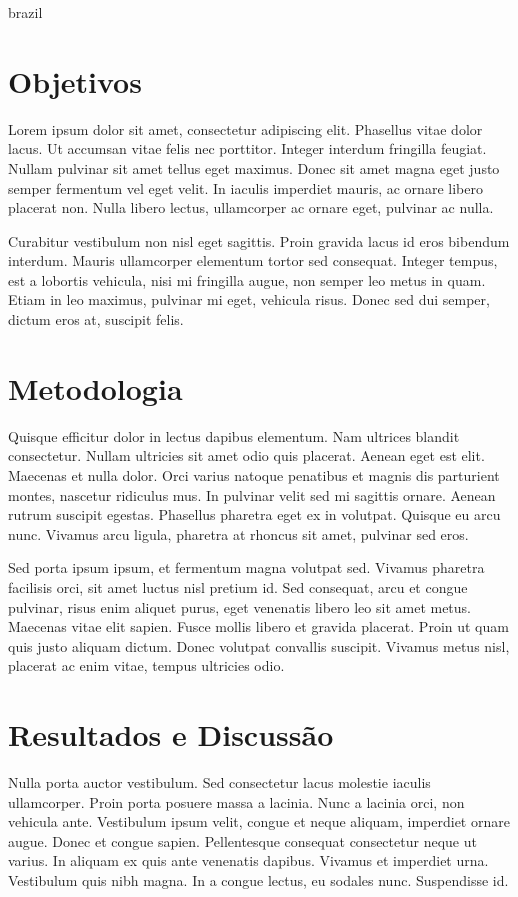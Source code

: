 \begin{otherlanguage*}{brazil}
        \section*{Objetivos}
        Lorem ipsum dolor sit amet, consectetur adipiscing elit. Phasellus vitae dolor lacus. Ut
        accumsan vitae felis nec porttitor. Integer interdum fringilla feugiat. Nullam pulvinar sit
        amet tellus eget maximus. Donec sit amet magna eget justo semper fermentum vel eget velit.
        In iaculis imperdiet mauris, ac ornare libero placerat non. Nulla libero lectus, ullamcorper
        ac ornare eget, pulvinar ac nulla.

        Curabitur vestibulum non nisl eget sagittis. Proin
        gravida lacus id eros bibendum interdum. Mauris ullamcorper elementum tortor sed consequat.
        Integer tempus, est a lobortis vehicula, nisi mi fringilla augue, non semper leo metus in
        quam. Etiam in leo maximus, pulvinar mi eget, vehicula risus. Donec sed dui semper, dictum
        eros at, suscipit felis.

        \section*{Metodologia}
        Quisque efficitur dolor in lectus dapibus elementum. Nam ultrices blandit consectetur.
        Nullam ultricies sit amet odio quis placerat. Aenean eget est elit. Maecenas et nulla dolor.
        Orci varius natoque penatibus et magnis dis parturient montes, nascetur ridiculus mus. In
        pulvinar velit sed mi sagittis ornare. Aenean rutrum suscipit egestas. Phasellus pharetra
        eget ex in volutpat. Quisque eu arcu nunc. Vivamus arcu ligula, pharetra at rhoncus sit
        amet, pulvinar sed eros.

        Sed porta ipsum ipsum, et fermentum magna volutpat sed. Vivamus
        pharetra facilisis orci, sit amet luctus nisl pretium id. Sed consequat, arcu et congue
        pulvinar, risus enim aliquet purus, eget venenatis libero leo sit amet metus. Maecenas vitae
        elit sapien. Fusce mollis libero et gravida placerat. Proin ut quam quis justo aliquam
        dictum. Donec volutpat convallis suscipit. Vivamus metus nisl, placerat ac enim vitae,
        tempus ultricies odio.

        \section*{Resultados e Discussão}
        Nulla porta auctor vestibulum. Sed
        consectetur lacus molestie iaculis ullamcorper. Proin porta posuere massa a lacinia. Nunc a
        lacinia orci, non vehicula ante. Vestibulum ipsum velit, congue et neque aliquam, imperdiet
        ornare augue. Donec et congue sapien. Pellentesque consequat consectetur neque ut varius. In
        aliquam ex quis ante venenatis dapibus. Vivamus et imperdiet urna. Vestibulum quis nibh
        magna. In a congue lectus, eu sodales nunc. Suspendisse id.


\end{otherlanguage*}
